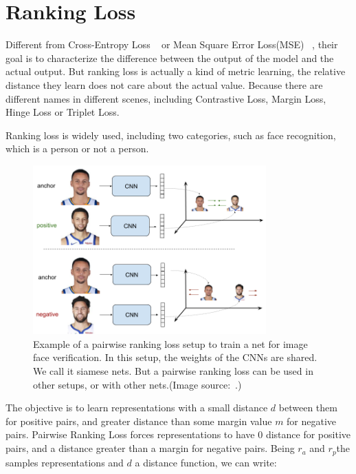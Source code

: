 \section{Ranking Loss}

Different from Cross-Entropy Loss ~\cite{Categorical_Loss} or Mean Square Error Loss(MSE) ~\cite{CHRISTOFFERSEN2004291}, their goal is to characterize the difference between the output of the model and the actual output. But ranking loss is actually a kind of metric learning, the relative distance they learn does not care about the actual value. Because there are different names in different scenes, including Contrastive Loss, Margin Loss, Hinge Loss or Triplet Loss.

Ranking loss is widely used, including two categories, such as face recognition, which is a person or not a person.

\begin{figure}[!htbp]
	\centering
	\includegraphics[width = 0.8\textwidth]{figures/pairwise_ranking_loss_faces.png}
	\caption[Example of a pairwise ranking loss ]
	{ Example of a pairwise ranking loss setup to train a net for image face verification. In this setup, the weights of the CNNs are shared. We call it siamese nets. But a pairwise ranking loss can be used in other setups, or with other nets.(Image source:~\cite{triplet_loss_em}.)}
	\label{fig:pairwise_ranking_loss}
\end{figure}


The objective is to learn representations with a small distance $d$ between them for positive pairs, and greater distance than some margin value $m$ for negative pairs. Pairwise Ranking Loss forces representations to have $0$ distance for positive pairs, and a distance greater than a margin for negative pairs. Being $r_a$ and $r_p$the samples representations and $d$ a distance function, we can write:

